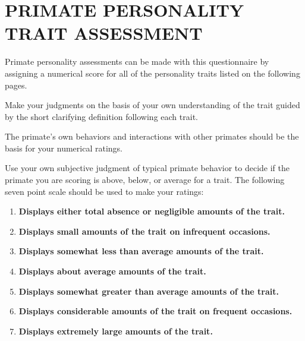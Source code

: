 \documentclass{article} %
\begin{document}


\noindent 

\noindent 

\noindent 

\noindent 




\noindent 
\section{PRIMATE PERSONALITY TRAIT ASSESSMENT  }

\noindent  

\noindent Primate personality assessments can be made with this questionnaire by assigning a numerical score for all of the personality traits listed on the following pages.  

\noindent Make your judgments on the basis of your own understanding of the trait guided by the short clarifying definition following each trait.  

\noindent The primate's own behaviors and interactions with other primates should be the basis for your numerical ratings.  

\noindent Use your own subjective judgment of typical primate behavior to decide if the primate you are scoring is above, below, or average for a trait. The following seven point scale should be used to make your ratings:\textbf{  }

\noindent \textbf{ }

\begin{enumerate}
\item  \textbf{Displays either total absence or negligible amounts of the trait.  }

\item  \textbf{Displays small amounts of the trait on infrequent occasions.  }

\item  \textbf{Displays somewhat less than average amounts of the trait.  }

\item  \textbf{Displays about average amounts of the trait.  }

\item  \textbf{Displays somewhat greater than average amounts of the trait.  }

\item  \textbf{Displays considerable amounts of the trait on frequent occasions.  }

\item  \textbf{Displays extremely large amounts of the trait.   }
\end{enumerate}
\end{document}
